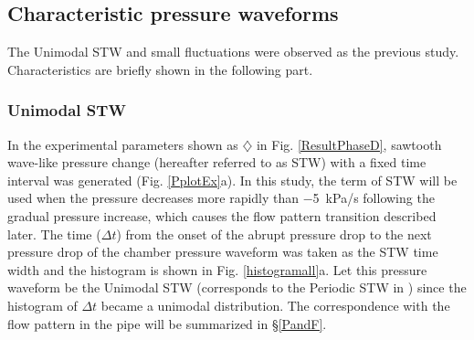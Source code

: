 \documentclass[aps,pre,preprint,groupedaddress,showkeys]{revtex4-2}
\begin{document}
\subsection{Characteristic pressure waveforms}
The Unimodal STW and small fluctuations were observed as the previous study. 
Characteristics are briefly shown in the following part.
\subsubsection{Unimodal STW}
In the experimental parameters shown as $\diamondsuit$ in Fig. \ref{ResultPhaseD}, sawtooth wave-like pressure change (hereafter referred to as STW) with a fixed time interval was generated (Fig. \ref{PplotEx}a).
In this study, the term of STW will be used when the pressure decreases more rapidly than \SI{-5}{kPa/s} following the gradual pressure increase, which causes the flow pattern transition described later.
The time ($\Delta t$) from the onset of the abrupt pressure drop to the next pressure drop of the chamber pressure waveform was taken as the STW time width and the histogram is shown in Fig. \ref {histogramall}a.
Let this pressure waveform be the Unimodal STW (corresponds to the Periodic STW in \citep{kanno2018}) since the histogram of $\Delta t$ became a unimodal distribution.
The correspondence with the flow pattern in the pipe will be summarized in \S \ref{PandF}.
\end{document}
